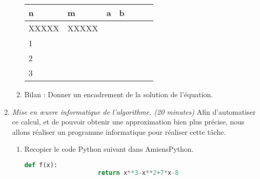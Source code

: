 \documentclass{article}
\begin{document}
\begin{enumerate}
\begin{enumerate}
                \begin{tabularx}{\linewidth}{|X|X|X|X|X|X|X|}
                    \hline
                    n & m & a & b \\
                    \hline
                    \hline
                    XXXXX & XXXXX &   &   \\
                    \hline
                    1 &   &   &   \\
                    \hline
                    2 &   &   &   \\
                    \hline
                    3 &   &   &   \\
                    \hline
                \end{tabularx}
            \item Bilan : Donner un encadrement de la solution de l'équation.
        \end{enumerate}
    \item \emph{Mise en œuvre informatique de l'algorithme. (20 minutes)} Afin d'automatiser ce calcul, et de pouvoir obtenir une approximation bien plus précise, nous allons réaliser un programme informatique pour réaliser cette tâche.
        \begin{enumerate}
            \item Recopier le code Python suivant dans AmiensPython.
                \begin{lstlisting}[language=python,frame=lines,mathescape=true]
                def f(x):
                    return x**3-x**2+7*x-8


\end{lstlisting}
\end{enumerate}
\end{enumerate}
\end{document}
